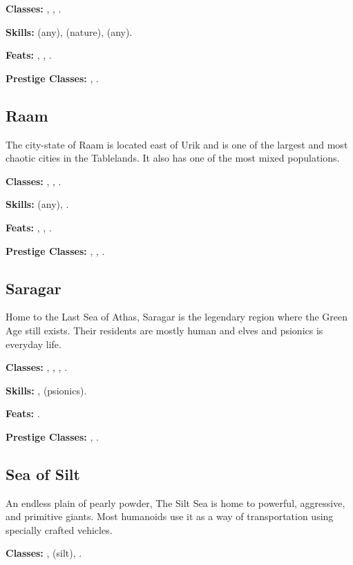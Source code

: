 \textbf{Classes:} , , .

\textbf{Skills:}  (any),  (nature),  (any).

\textbf{Feats:} , , .

\textbf{Prestige Classes:} , .

\subsection{Raam}
The city-state of Raam is located east of Urik and is one of the largest and most chaotic cities in the Tablelands. It also has one of the most mixed populations.

\textbf{Classes:} , , .

\textbf{Skills:}  (any), .

\textbf{Feats:} , , .

\textbf{Prestige Classes:} , , .

\subsection{Saragar}
Home to the Last Sea of Athas, Saragar is the legendary region where the Green Age still exists. Their residents are mostly human and elves and psionics is everyday life.

\textbf{Classes:} , , , .

\textbf{Skills:} ,  (psionics).

\textbf{Feats:} .

\textbf{Prestige Classes:} , .


\subsection{Sea of Silt}
An endless plain of pearly powder, The Silt Sea is home to powerful, aggressive, and primitive giants. Most humanoids use it as a way of transportation using specially crafted vehicles.

\textbf{Classes:} ,  (silt), .

